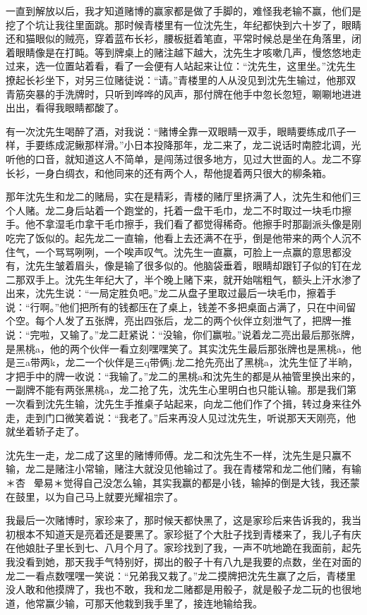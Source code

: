 \documentclass[12pt,UTF8]{ctexbook}
\begin{document}
一直到解放以后，我才知道赌博的赢家都是做了手脚的，难怪我老输不赢，他们是挖了个坑让我往里面跳。那时候青楼里有一位沈先生，年纪都快到六十岁了，眼睛还和猫眼似的贼亮，穿着蓝布长衫，腰板挺着笔直，平常时候总是坐在角落里，闭着眼睛像是在打盹。等到牌桌上的赌注越下越大，沈先生才咳嗽几声，慢悠悠地走过来，选一位置站着看，看了一会便有人站起来让位：“沈先生，这里坐。”沈先生撩起长衫坐下，对另三位赌徒说：“请。”青楼里的人从没见到沈先生输过，他那双青筋突暴的手洗牌时，只听到哗哗的风声，那付牌在他手中忽长忽短，唰唰地进进出出，看得我眼睛都酸了。

有一次沈先生喝醉了酒，对我说：“赌博全靠一双眼睛一双手，眼睛要练成爪子一样，手要练成泥鳅那样滑。”小日本投降那年，龙二来了，龙二说话时南腔北调，光听他的口音，就知道这人不简单，是闯荡过很多地方，见过大世面的人。龙二不穿长衫，一身白绸衣，和他同来的还有两个人，帮他提着两只很大的柳条箱。

那年沈先生和龙二的赌局，实在是精彩，青楼的赌厅里挤满了人，沈先生和他们三个人赌。龙二身后站着一个跑堂的，托着一盘干毛巾，龙二不时取过一块毛巾擦手。他不拿湿毛巾拿干毛巾擦手，我们看了都觉得稀奇。他擦手时那副派头像是刚吃完了饭似的。起先龙二一直输，他看上去还满不在乎，倒是他带来的两个人沉不住气，一个骂骂咧咧，一个唉声叹气。沈先生一直赢，可脸上一点赢的意思都没有，沈先生皱着眉头，像是输了很多似的。他脑袋垂着，眼睛却跟钉子似的钉在龙二那双手上。沈先生年纪大了，半个晚上赌下来，就开始喘粗气，额头上汗水渗了出来，沈先生说：“一局定胜负吧。”龙二从盘子里取过最后一块毛巾，擦着手说：“行啊。”他们把所有的钱都压在了桌上，钱差不多把桌面占满了，只在中间留个空。每个人发了五张牌，亮出四张后，龙二的两个伙伴立刻泄气了，把牌一推说：“完啦，又输了。”龙二赶紧说：“没输，你们赢啦。”说着龙二亮出最后那张牌，是黑桃a，他的两个伙伴一看立刻嘿嘿笑了。其实沈先生最后那张牌也是黑桃a，他是三a带两k，龙二一个伙伴是三q带俩j.龙二抢先亮出了黑桃a，沈先生怔了半晌，才把手中的牌一收说：“我输了。”龙二的黑桃a和沈先生的都是从袖管里换出来的，一副牌不能有两张黑桃a，龙二抢了先，沈先生心里明白也只能认输。那是我们第一次看到沈先生输，沈先生手推桌子站起来，向龙二他们作了个揖，转过身来往外走，走到门口微笑着说：“我老了。”后来再没人见过沈先生，听说那天天刚亮，他就坐着轿子走了。

沈先生一走，龙二成了这里的赌博师傅。龙二和沈先生不一样，沈先生是只赢不输，龙二是赌注小常输，赌注大就没见他输过了。我在青楼常和龙二他们赌，有输＊杏晕易＊觉得自己没怎么输，其实我赢的都是小钱，输掉的倒是大钱，我还蒙在鼓里，以为自己马上就要光耀祖宗了。

我最后一次赌博时，家珍来了，那时候天都快黑了，这是家珍后来告诉我的，我当初根本不知道天是亮着还是要黑了。家珍挺了个大肚子找到青楼来了，我儿子有庆在他娘肚子里长到七、八月个月了。家珍找到了我，一声不吭地跪在我面前，起先我没看到她，那天我手气特别好，掷出的骰子十有八九是我要的点数，坐在对面的龙二一看点数嘿嘿一笑说：“兄弟我又栽了。”龙二摸牌把沈先生赢了之后，青楼里没人敢和他摸牌了，我也不敢，我和龙二赌都是用骰子，就是骰子龙二玩的也很地道，他常赢少输，可那天他栽到我手里了，接连地输给我。
\end{document}
